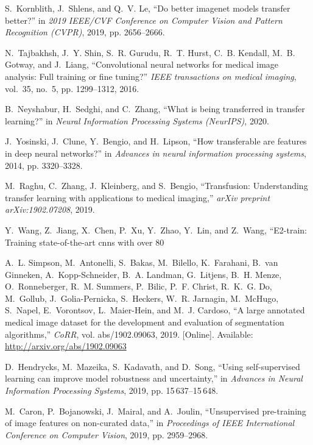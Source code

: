 \documentclass[journal,twoside,web]{ieeecolor}
\begin{document}
\begin{thebibliography}{10}
S.~{Kornblith}, J.~{Shlens}, and Q.~V. {Le}, ``Do better imagenet models
  transfer better?'' in \emph{2019 IEEE/CVF Conference on Computer Vision and
  Pattern Recognition (CVPR)}, 2019, pp. 2656--2666.

N.~Tajbakhsh, J.~Y. Shin, S.~R. Gurudu, R.~T. Hurst, C.~B. Kendall, M.~B.
  Gotway, and J.~Liang, ``Convolutional neural networks for medical image
  analysis: Full training or fine tuning?'' \emph{IEEE transactions on medical
  imaging}, vol.~35, no.~5, pp. 1299--1312, 2016.

B.~Neyshabur, H.~Sedghi, and C.~Zhang, ``What is being transferred in transfer
  learning?'' in \emph{Neural Information Processing Systems (NeurIPS)}, 2020.

J.~Yosinski, J.~Clune, Y.~Bengio, and H.~Lipson, ``How transferable are
  features in deep neural networks?'' in \emph{Advances in neural information
  processing systems}, 2014, pp. 3320--3328.

M.~Raghu, C.~Zhang, J.~Kleinberg, and S.~Bengio, ``Transfusion: Understanding
  transfer learning with applications to medical imaging,'' \emph{arXiv
  preprint arXiv:1902.07208}, 2019.

Y.~Wang, Z.~Jiang, X.~Chen, P.~Xu, Y.~Zhao, Y.~Lin, and Z.~Wang, ``E2-train:
  Training state-of-the-art cnns with over 80

\BIBentryALTinterwordspacing
A.~L. Simpson, M.~Antonelli, S.~Bakas, M.~Bilello, K.~Farahani, B.~van
  Ginneken, A.~Kopp{-}Schneider, B.~A. Landman, G.~Litjens, B.~H. Menze,
  O.~Ronneberger, R.~M. Summers, P.~Bilic, P.~F. Christ, R.~K.~G. Do,
  M.~Gollub, J.~Golia{-}Pernicka, S.~Heckers, W.~R. Jarnagin, M.~McHugo,
  S.~Napel, E.~Vorontsov, L.~Maier{-}Hein, and M.~J. Cardoso, ``A large
  annotated medical image dataset for the development and evaluation of
  segmentation algorithms,'' \emph{CoRR}, vol. abs/1902.09063, 2019. [Online].
  Available: \url{http://arxiv.org/abs/1902.09063}
\BIBentrySTDinterwordspacing

D.~Hendrycks, M.~Mazeika, S.~Kadavath, and D.~Song, ``Using self-supervised
  learning can improve model robustness and uncertainty,'' in \emph{Advances in
  Neural Information Processing Systems}, 2019, pp. 15\,637--15\,648.

M.~Caron, P.~Bojanowski, J.~Mairal, and A.~Joulin, ``Unsupervised pre-training
  of image features on non-curated data,'' in \emph{Proceedings of IEEE
  International Conference on Computer Vision}, 2019, pp. 2959--2968.


\end{thebibliography}
\end{document}
